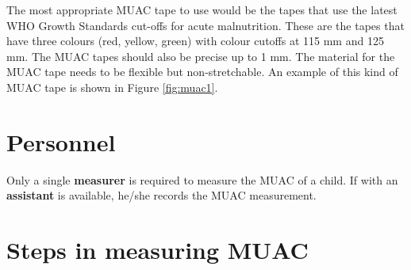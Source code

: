 \documentclass[12pt,]{book}
\theoremstyle{definition}
\theoremstyle{definition}
\theoremstyle{definition}
\theoremstyle{remark}
\begin{document}
The most appropriate MUAC tape to use would be the tapes that use the
latest WHO Growth Standards cut-offs for acute malnutrition. These are
the tapes that have three colours (red, yellow, green) with colour
cutoffs at 115 mm and 125 mm. The MUAC tapes should also be precise up
to 1 mm. The material for the MUAC tape needs to be flexible but
non-stretchable. An example of this kind of MUAC tape is shown in Figure
\ref{fig:muac1}.

\hypertarget{personnel-2}{%
\section{Personnel}\label{personnel-2}}

Only a single \textbf{measurer} is required to measure the MUAC of a
child. If with an \textbf{assistant} is available, he/she records the
MUAC measurement.

\hypertarget{steps-in-measuring-muac}{%
\section{Steps in measuring MUAC}\label{steps-in-measuring-muac}}
\end{document}
